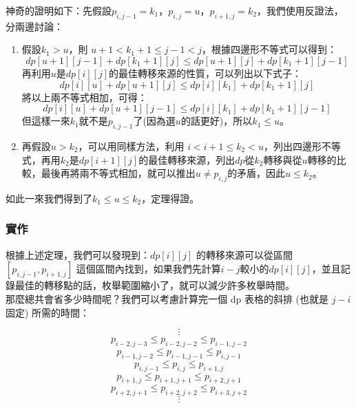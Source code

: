\documentclass[main.tex]{subfiles}
\begin{document}
	神奇的證明如下：先假設$p_{i, j-1} = k_1$，$p_{i, j} = u$，$p_{i+1, j} = k_2$，我們使用反證法，分兩邊討論：
	
	\begin{enumerate}
		\item 假設$k_1 > u$，則 $u+1 < k_1+1 \leq j-1 < j $，根據四邊形不等式可以得到：
		\begin{displaymath}
		dp[u+1][j-1] + dp[k_1+1][j] \leq dp[u+1][j] + dp[k_1+1][j-1]
		\end{displaymath}
		再利用$u$是$dp[i][j]$的最佳轉移來源的性質，可以列出以下式子：
		\begin{displaymath}
		dp[i][u] + dp[u+1][j] \leq dp[i][k_1] + dp[k_1+1][j]
		\end{displaymath}
		將以上兩不等式相加，可得：
		\begin{displaymath}
		dp[i][u] + dp[u+1][j-1] \leq dp[i][k_1] + dp[k_1+1][j-1]
		\end{displaymath}
		但這樣一來$k_1$就不是$p_{i, j-1}$了(因為選$u$的話更好)，所以$k_1 \leq u$。
		
		\item 再假設$u > k_2$，可以用同樣方法，利用 $i < i+1 \leq k_2 < u $，列出四邊形不等式，再用$k_2$是$dp[i+1][j]$的最佳轉移來源，列出$dp$從$k_2$轉移與從$u$轉移的比較，最後再將兩不等式相加，就可以推出$u \neq p_{i, j}$的矛盾，因此$u \leq k_2$。
	\end{enumerate}
	
	如此一來我們得到了$k_1 \leq u \leq k_2$，定理得證。
	
	\subsubsection{實作}
	
	根據上述定理，我們可以發現到：$dp[i][j]$ 的轉移來源可以從區間 $[p_{i,j−1}, p_{i+1,j} ]$ 這個區間內找到，如果我們先計算$i-j$較小的$dp[i][j]$，並且記錄最佳的轉移點的話，枚舉範圍縮小了，就可以減少許多枚舉時間。\\
	
	那麼總共會省多少時間呢？我們可以考慮計算完一個 dp 表格的斜排 (也就是 $j - i$ 固定) 所需的時間：
	
	\begin{displaymath}
	\vdots
	\end{displaymath}
	\begin{displaymath}
	p_{i−2,j−3} \leq p_{i−2,j−2} \leq p_{i−1,j−2}
	\end{displaymath}
	\begin{displaymath}
	p_{i−1,j−2} \leq p_{i−1,j−1} \leq p_{i,j−1}
	\end{displaymath}
	\begin{displaymath}
	p_{i,j−1} \leq p_{i,j} \leq p_{i+1,j}
	\end{displaymath}
	\begin{displaymath}
	p_{i+1,j} \leq p_{i+1,j+1} \leq p_{i+2,j+1}
	\end{displaymath}
	\begin{displaymath}
	p_{i+2,j+1} \leq p_{i+2,j+2} \leq p_{i+3,j+2}
	\end{displaymath}
	\begin{displaymath}
	\vdots
	\end{displaymath}
	
\end{document}
